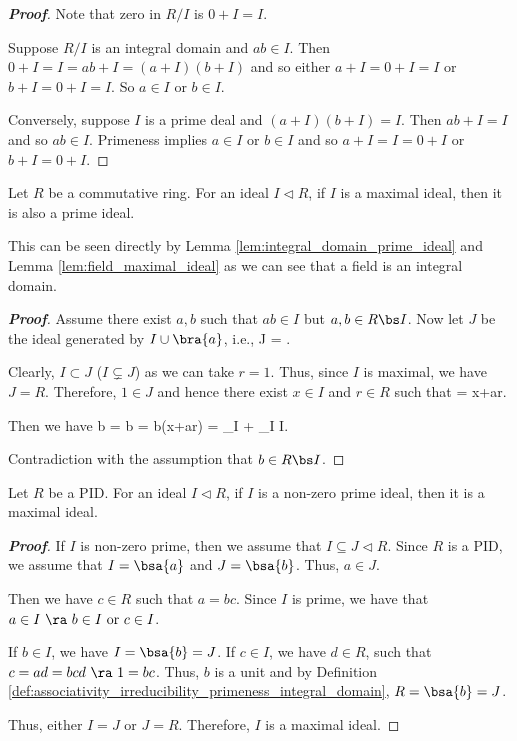 \begin{proof}[\bf Proof]
Note that zero in $R/I$ is $0 + I = I$.

Suppose $R/I$ is an integral domain and $ab \in I$. Then $0 + I = I = ab+I = (a+I)(b+I)$ and so either $a + I = 0 + I = I$ or $b + I = 0 + I = I$. So $a \in I$ or $b \in I$.

Conversely, suppose $I$ is a prime deal and $(a + I)(b + I) = I$. Then $ab + I = I$ and so $ab \in I$. Primeness implies $a \in I$ or $b \in I$ and so $a + I = I = 0 + I$ or $b + I = 0 + I$.
\end{proof}

\begin{theorem}\label{thm:cr_maximal_ideal_implies_prime}
Let $R$ be a commutative ring. For an ideal $I \lhd R$, if $I$ is a maximal ideal, then it is also a prime ideal.
\end{theorem}

\begin{remark}
This can be seen directly by Lemma \ref{lem:integral_domain_prime_ideal} and Lemma \ref{lem:field_maximal_ideal} as we can see that a field is an integral domain.
\end{remark}

\begin{proof}[\bf Proof]
Assume there exist $a,b$ such that $ab\in I$ but $a,b\in R\bs I$. Now let $J$ be the ideal generated by $I\cup \bra{a}$, i.e.,
\be
J = .
\ee

Clearly, $I\subset J$ ($I \subsetneq J$) as we can take $r=1$. Thus, since $I$ is maximal, we have $J = R$. Therefore, $1\in J$ and hence there exist $x\in I$ and $r\in R$ such that
 = x+ar.
\ee

Then we have
\be
b = b = b(x+ar) = _{\in I} + _{\in I} \in I.
\ee

Contradiction with the assumption that $b\in R\bs I$.
\end{proof}

\begin{theorem}\label{thm:pid_prime_ideal_implies_maximal}
Let $R$ be a PID. For an ideal $I \lhd R$, if $I$ is a non-zero prime ideal, then it is a maximal ideal.
\end{theorem}

\begin{proof}[\bf Proof]
If $I$ is non-zero prime, then we assume that $I\subseteq J\lhd R$. Since $R$ is a PID, we assume that $I = \bsa{a}$ and $J = \bsa{b}$. Thus, $a\in J$.

Then we have $c\in R$ such that $a = bc$. Since $I$ is prime, we have that $a\in I \ \ra \ b\in I\text{ or }c\in I$.

If $b\in I$, we have $I = \bsa{b} = J$. If $c\in I$, we have $d\in R$, such that $c = ad = bcd \ \ra \ 1 = bc$. Thus, $b$ is a unit and by Definition \ref{def:associativity_irreducibility_primeness_integral_domain}, $R = \bsa{b} = J$.

Thus, either $I=J$ or $J=R$. Therefore, $I$ is a maximal ideal.
\end{proof}

